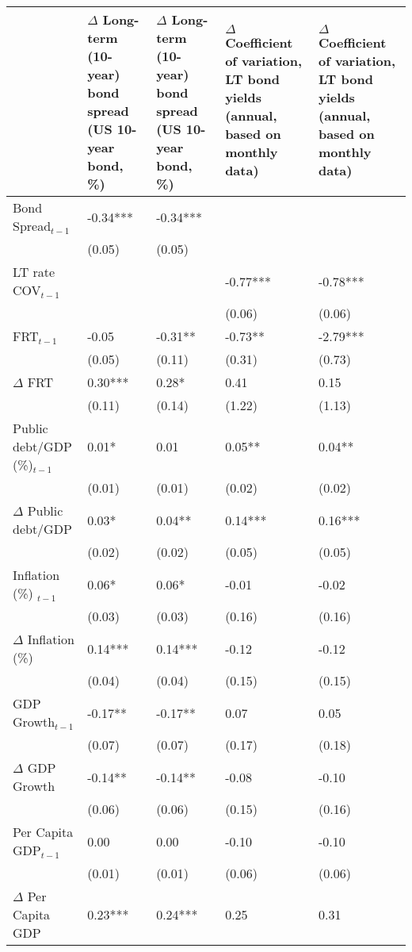 \begingroup\tiny
\begin{tabular}{lp{3cm}p{3cm}p{3cm}p{3cm}}
  \hline
 & $\Delta$ Long-term (10-year) bond spread (US 10-year bond, \%) & $\Delta$ Long-term (10-year) bond spread (US 10-year bond, \%) & $\Delta$ Coefficient of variation, LT bond yields (annual, based on monthly data) & $\Delta$ Coefficient of variation, LT bond yields (annual, based on monthly data) \\ 
  \hline
Bond Spread$_{t-1}$ & -0.34*** & -0.34*** &  &  \\ 
   & (0.05) & (0.05) &  &  \\ 
  LT rate COV$_{t-1}$ &  &  & -0.77*** & -0.78*** \\ 
   &  &  & (0.06) & (0.06) \\ 
  FRT$_{t-1}$ & -0.05 & -0.31** & -0.73** & -2.79*** \\ 
   & (0.05) & (0.11) & (0.31) & (0.73) \\ 
  $\Delta$ FRT & 0.30*** & 0.28* & 0.41 & 0.15 \\ 
   & (0.11) & (0.14) & (1.22) & (1.13) \\ 
  Public debt/GDP (\%)$_{t-1}$ & 0.01* & 0.01 & 0.05** & 0.04** \\ 
   & (0.01) & (0.01) & (0.02) & (0.02) \\ 
  $\Delta$ Public debt/GDP & 0.03* & 0.04** & 0.14*** & 0.16*** \\ 
   & (0.02) & (0.02) & (0.05) & (0.05) \\ 
  Inflation (\%) $_{t-1}$ & 0.06* & 0.06* & -0.01 & -0.02 \\ 
   & (0.03) & (0.03) & (0.16) & (0.16) \\ 
  $\Delta$ Inflation (\%) & 0.14*** & 0.14*** & -0.12 & -0.12 \\ 
   & (0.04) & (0.04) & (0.15) & (0.15) \\ 
  GDP Growth$_{t-1}$ & -0.17** & -0.17** & 0.07 & 0.05 \\ 
   & (0.07) & (0.07) & (0.17) & (0.18) \\ 
  $\Delta$ GDP Growth & -0.14** & -0.14** & -0.08 & -0.10 \\ 
   & (0.06) & (0.06) & (0.15) & (0.16) \\ 
  Per Capita GDP$_{t-1}$ & 0.00 & 0.00 & -0.10 & -0.10 \\ 
   & (0.01) & (0.01) & (0.06) & (0.06) \\ 
  $\Delta$ Per Capita GDP & 0.23*** & 0.24*** & 0.25 & 0.31 \\ 

\end{tabular}
